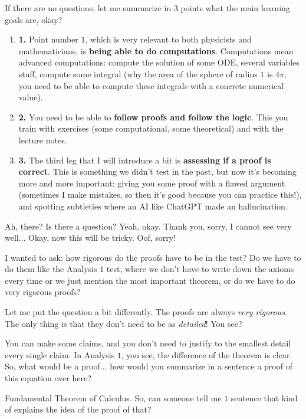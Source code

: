 \begin{spoken-clean}[00:38:15 - 00:40:10]
If there are no questions, let me summarize in $3$ points what the main learning goals are, okay?
\begin{enumerate}[label=\textbf{\arabic*.}]
    \item \textbf{1.} Point number $1$, which is very relevant to both physicists and mathematicians, is \textbf{being able to do computations}. Computations mean advanced computations: compute the solution of some ODE, several variables stuff, compute some integral (why the area of the sphere of radius $1$ is $4\pi$, you need to be able to compute these integrals with a concrete numerical value).
    \item \textbf{2.} You need to be able to \textbf{follow proofs and follow the logic}. This you train with exercises (some computational, some theoretical) and with the lecture notes.
    \item \textbf{3.} The third leg that I will introduce a bit is \textbf{assessing if a proof is correct}. This is something we didn't test in the past, but now it's becoming more and more important: giving you some proof with a flawed argument (sometimes I make mistakes, so then it's good because you can practice this!), and spotting subtleties where an AI like ChatGPT made an hallucination.
\end{enumerate}
\end{spoken-clean}

\begin{spoken-clean}[00:40:10 - 00:40:20]
 Ah, there? Is there a question? Yeah, okay. Thank you, sorry, I cannot see very well... Okay, now this will be tricky.  Oof, sorry!
\end{spoken-clean}

\begin{student-interaction}
I wanted to ask: how rigorous do the proofs have to be in the test? Do we have to do them like the Analysis $1$ test, where we don't have to write down the axioms every time or we just mention the most important theorem, or do we have to do very rigorous proofs?
\end{student-interaction}

\begin{spoken-clean}[00:41:23 - 00:44:34]
Let me put the question a bit differently. The proofs are always \emph{very rigorous}. The only thing is that they don't need to be as \emph{detailed}! You see?

You can make some claims, and you don't need to justify to the smallest detail every single claim. In Analysis $1$, you see, the difference of the theorem is clear. So, what would be a proof... how would you summarize in a sentence a proof of this equation over here?


Fundamental Theorem of Calculus. So, can someone tell me $1$ sentence that kind of explains the idea of the proof of that?
\end{spoken-clean}

